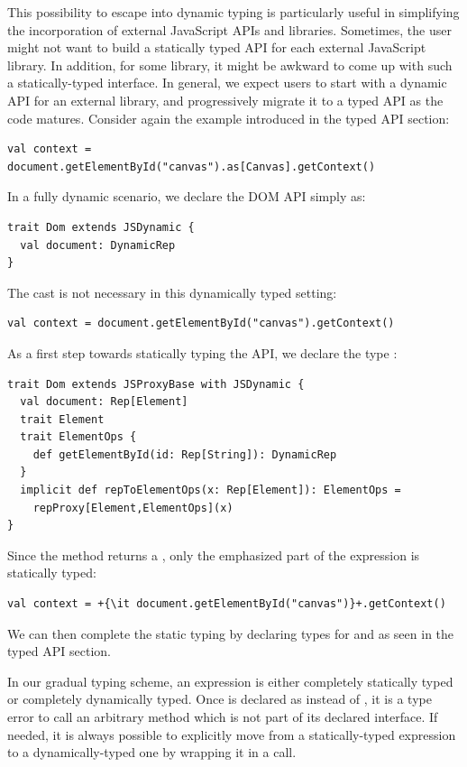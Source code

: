 \documentclass[runningheads,a4paper]{llncs}
\begin{document}
This possibility to escape into dynamic typing is particularly useful
in simplifying the incorporation of external JavaScript APIs and
libraries. Sometimes, the user might not want to build a statically
typed API for each external JavaScript library. In addition, for
some library, it might be awkward to come up with such a statically-typed
interface. In general, we expect users to start with a dynamic API for
an external library, and progressively migrate it to a typed API as
the code matures. Consider again the example introduced in the typed
API section:
\begin{lstlisting}
val context = document.getElementById("canvas").as[Canvas].getContext()
\end{lstlisting}

In a fully dynamic scenario, we declare the DOM API simply as:
\begin{lstlisting}
trait Dom extends JSDynamic {
  val document: DynamicRep
}
\end{lstlisting}
The  cast is not necessary in this dynamically typed
setting:
\begin{lstlisting}[escapechar=+]
val context = document.getElementById("canvas").getContext()
\end{lstlisting}

As a first step towards statically typing the API, we declare the type :
\begin{lstlisting}
trait Dom extends JSProxyBase with JSDynamic {
  val document: Rep[Element]
  trait Element
  trait ElementOps {
    def getElementById(id: Rep[String]): DynamicRep
  }
  implicit def repToElementOps(x: Rep[Element]): ElementOps =
    repProxy[Element,ElementOps](x)
}
\end{lstlisting}
Since the method  returns a ,
only the emphasized part of the expression is statically typed:
\begin{lstlisting}[escapechar=+]
val context = +{\it document.getElementById("canvas")}+.getContext()
\end{lstlisting}

We can then complete the static typing by declaring types for
 and  as seen in the typed API section.

In our gradual typing scheme, an expression is either completely
statically typed or completely dynamically typed. Once 
is declared as  instead of , it is
a type error to call an arbitrary method which is not part of its
declared  interface. If needed, it is always possible to
explicitly move from a statically-typed expression to a
dynamically-typed one by wrapping it in a  call.
\end{document}
